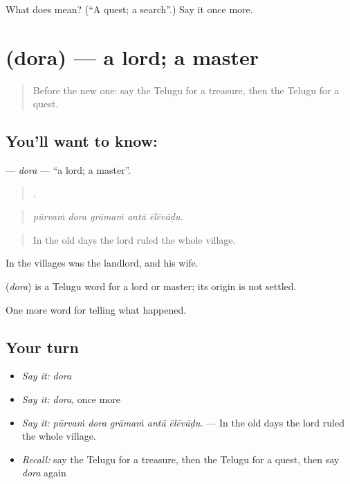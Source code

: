 \begin{tcolorbox}[breakable,colback=teal!4,colframe=teal!35!black,title={Before you move on}]
What does  mean? (\textquotedblleft{}A quest; a search\textquotedblright{}.) Say it once more.
\end{tcolorbox}
\section[\texorpdfstring{\te{దొర} (dora)}{దొర (dora)}]{ (dora) — a lord; a master}

\label{lesson:TE-C366-dora}



\begin{quote}
Before the new one: say the Telugu for a treasure, then the Telugu for a quest.
\end{quote}

\subsection*{You'll want to know: }
\textbf{} — \emph{dora} — \textquotedblleft{}a lord; a master\textquotedblright{}.

\begin{quote}
    .
\end{quote}

\begin{quote}
\emph{pūrvaṁ dora grāmaṁ antā ēlēvāḍu.}
\end{quote}

\begin{quote}
In the old days the lord ruled the whole village.
\end{quote}

In the villages  was the landlord, and  his wife.

\begin{cousinweb}
\textbf{} (\emph{dora}) is a Telugu word for a lord or master; its origin is not settled.
\end{cousinweb}

\begin{grammarlens}[title={What you've built}]
One more word for telling what happened.
\end{grammarlens}

\subsection*{Your turn}
\begin{itemize}
\raggedright
  \item \emph{Say it:} \emph{dora}
  \item \emph{Say it:} \emph{dora}, once more
  \item \emph{Say it:} \emph{pūrvaṁ dora grāmaṁ antā ēlēvāḍu.} — In the old days the lord ruled the whole village.
  \item \emph{Recall:} say the Telugu for a treasure, then the Telugu for a quest, then say \emph{dora} again
\end{itemize}

